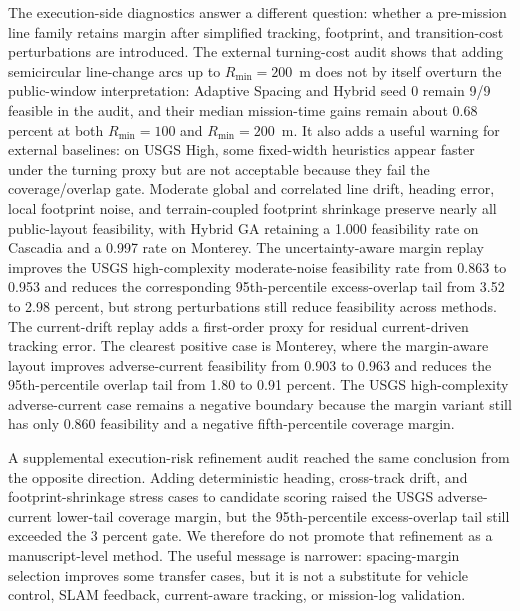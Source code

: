 \documentclass[jmse,article,submit,moreauthors]{Definitions/mdpi}
\begin{document}
The execution-side diagnostics answer a different question: whether a pre-mission line family retains margin after simplified tracking, footprint, and transition-cost perturbations are introduced. The external turning-cost audit shows that adding semicircular line-change arcs up to \(R_{\min}=200\)~m does not by itself overturn the public-window interpretation: Adaptive Spacing and Hybrid seed 0 remain 9/9 feasible in the audit, and their median mission-time gains remain about 0.68 percent at both \(R_{\min}=100\) and \(R_{\min}=200\)~m. It also adds a useful warning for external baselines: on USGS High, some fixed-width heuristics appear faster under the turning proxy but are not acceptable because they fail the coverage/overlap gate. Moderate global and correlated line drift, heading error, local footprint noise, and terrain-coupled footprint shrinkage preserve nearly all public-layout feasibility, with Hybrid GA retaining a 1.000 feasibility rate on Cascadia and a 0.997 rate on Monterey. The uncertainty-aware margin replay improves the USGS high-complexity moderate-noise feasibility rate from 0.863 to 0.953 and reduces the corresponding 95th-percentile excess-overlap tail from 3.52 to 2.98 percent, but strong perturbations still reduce feasibility across methods. The current-drift replay adds a first-order proxy for residual current-driven tracking error. The clearest positive case is Monterey, where the margin-aware layout improves adverse-current feasibility from 0.903 to 0.963 and reduces the 95th-percentile overlap tail from 1.80 to 0.91 percent. The USGS high-complexity adverse-current case remains a negative boundary because the margin variant still has only 0.860 feasibility and a negative fifth-percentile coverage margin.

A supplemental execution-risk refinement audit reached the same conclusion from the opposite direction. Adding deterministic heading, cross-track drift, and footprint-shrinkage stress cases to candidate scoring raised the USGS adverse-current lower-tail coverage margin, but the 95th-percentile excess-overlap tail still exceeded the 3 percent gate. We therefore do not promote that refinement as a manuscript-level method. The useful message is narrower: spacing-margin selection improves some transfer cases, but it is not a substitute for vehicle control, SLAM feedback, current-aware tracking, or mission-log validation.
\end{document}
